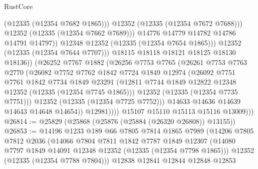 \begin{lexlean}{RustCore}
\begin{coremodule}
                                  (@12335 (@12354 @7682 @1865)))
                                @12352
                                (@12335 (@12354 @7672 @7688)))
                              @12352
                              (@12335 (@12354 @7662 @7689)))
                            @14776
                            @14779
                            @14782
                            @14786
                            @14791
                            @14797))
                        @12348
                        @12352
                        (@12335 (@12354 @7654 @1865)))
                      @12352
                      (@12335 (@12354 @7644 @7707)))
                    @18115
                    @18118
                    @18121
                    @18125
                    @18130
                    @18136))
                (@26252
                  @7767
                  @1882
                  (@26256
                    @7753
                    @7765
                    (@26261
                      @7753
                      @7763
                      @2770
                      (@26082
                        @7752
                        @7762
                        @1842
                        @7724
                        @1849
                        @12974
                        (@26092
                          @7751
                          @7761
                          @1842
                          @7734
                          @1849
                          @23291
                          (@12811 @7744 @1849 @12822 @12348 @12352 (@12335 (@12354 @7745 @1865)))
                          @12352
                          (@12335 (@12354 @7735 @7751)))
                        @12352
                        (@12335 (@12354 @7725 @7752)))
                      @14633
                      @14636
                      @14639
                      @14643
                      @14648
                      @14654))
                  @12981))))
          @15107
          @15110
          @15113
          @15116
          @13009)))
@26814 := @25829 (@25868 (@25876 (@25884 (@26320 @26808)) @13155))
@26853 := @14196
    @1233
    @189
    @66
    @7805
    @7814
    @1865
    @7989
    (@14206
      @7805
      @7812
      @2036
      (@14066
        @7804
        @7811
        @1842
        @7787
        @1849
        @12307
        (@14080 @7797 @1849 @14091 @12348 @12352 (@12335 (@12354 @7798 @1865)))
        @12352
        (@12335 (@12354 @7788 @7804)))
      @12838
      @12841
      @12844
      @12848
      @12853

\end{coremodule}
\end{lexlean}
